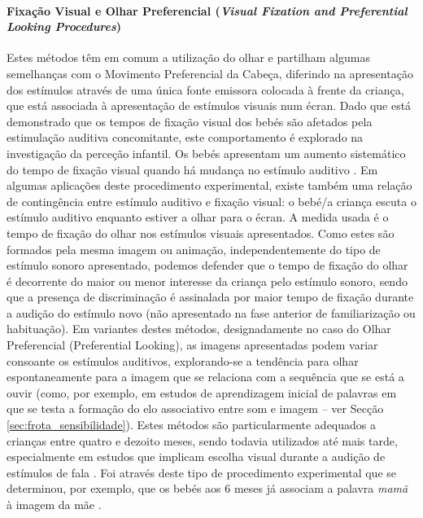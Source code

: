 \documentclass[output=paper]{LSP/langsci}
\begin{document}
\paragraph*{Fixação Visual e Olhar Preferencial (\textit{Visual Fixation and Preferential Looking Procedures})}
Estes métodos têm em comum a utilização do olhar e partilham algumas semelhanças com o Movimento Preferencial da Cabeça, diferindo na apresentação dos estímulos através de uma única fonte emissora colocada à frente da criança, que está associada à apresentação de estímulos visuais num écran. Dado que está demonstrado que os tempos de fixação visual dos bebés são afetados pela estimulação auditiva concomitante, este comportamento é explorado na investigação da perceção infantil. Os bebés apresentam um aumento sistemático do tempo de fixação visual quando há mudança no estímulo auditivo \citep{jusczyk1997}. Em algumas aplicações deste procedimento experimental, existe também uma relação de contingência entre estímulo auditivo e fixação visual: o bebé/a criança escuta o estímulo auditivo enquanto estiver a olhar para o écran.  A medida usada é o tempo de fixação do olhar nos estímulos visuais apresentados. Como estes são formados pela mesma imagem ou animação, independentemente do tipo de estímulo sonoro apresentado, podemos defender que o tempo de fixação do olhar é decorrente do maior ou menor interesse da criança pelo estímulo sonoro, sendo que a presença de discriminação é assinalada por maior tempo de fixação durante a audição do estímulo novo (não apresentado na fase anterior de familiarização ou habituação). Em variantes destes métodos, designadamente no caso do Olhar Preferencial (Preferential Looking), as imagens apresentadas podem variar consoante os estímulos auditivos, explorando-se a tendência para olhar espontaneamente para a imagem que se relaciona com a sequência que se está a ouvir (como, por exemplo, em estudos de aprendizagem inicial de palavras em que se testa a formação do elo associativo entre som e imagem -- ver Secção \ref{sec:frota_sensibilidade}). Estes métodos são particularmente adequados a crianças entre quatro e dezoito meses, sendo todavia utilizados até mais tarde, especialmente em estudos que implicam escolha visual durante a audição de estímulos de fala \citep{gervainmehler2010}. Foi através deste tipo de procedimento experimental que se determinou, por exemplo, que os bebés aos 6 meses já associam a palavra \textit{mamã} à imagem da mãe \citep{tincoffjusczyk1999}.
\end{document}
